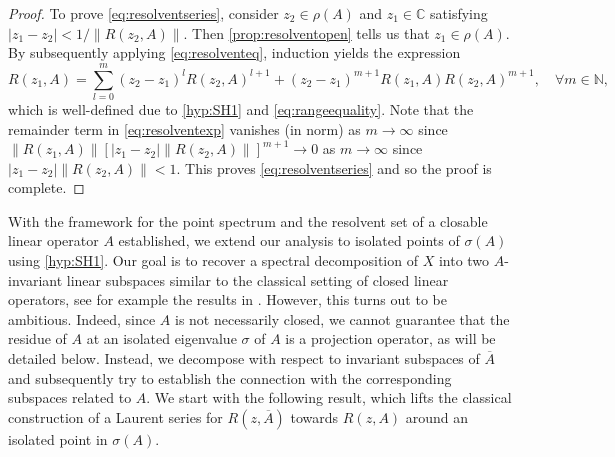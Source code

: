 \documentclass[english]{myarticle}
\begin{document}
\begin{sloppypar}
\begin{proof}
To prove \eqref{eq:resolventseries}, consider $z_2 \in \rho(A)$ and $z_1 \in \mathbb{C}$ satisfying $|z_1 - z_2| < 1/ \|R(z_2,A)\|$. Then \cref{prop:resolventopen} tells us that $z_1 \in \rho(A)$. By subsequently applying \eqref{eq:resolventeq}, induction yields the expression
\begin{equation} \label{eq:resolventexp}
    R(z_1,A) = \sum_{l=0}^{m} (z_2-z_1)^l R(z_2,A)^{l+1} + (z_2-z_1)^{m+1} R(z_1,A)R(z_2,A)^{m+1}, \quad \forall m \in \mathbb{N},
\end{equation}
which is well-defined due to \ref{hyp:SH1} and \eqref{eq:rangeequality}. Note that the remainder term in \eqref{eq:resolventexp} vanishes (in norm) as $m \to \infty$ since $\|R(z_1,A)\| [ |z_1-z_2| \|R(z_2,A)\|]^{m+1} \to 0$ as $m \to \infty$ since $|z_1 - z_2| \|R(z_2,A)\| < 1$. This proves \eqref{eq:resolventseries} and so the proof is complete.
\end{proof}

With the framework for the point spectrum and the resolvent set of a closable linear operator $A$ established, we extend our analysis to isolated points of $\sigma(A)$ using \ref{hyp:SH1}. Our goal is to recover a spectral decomposition of $X$ into two $A$-invariant linear subspaces similar to the classical setting of closed linear operators, see for example the results in \cite[Section XV.2]{Gohberg1990}. However, this turns out to be ambitious. Indeed, since $A$ is not necessarily closed, we cannot guarantee that the residue of $A$ at an isolated eigenvalue $\sigma$ of $A$ is a projection operator, as will be detailed below. Instead, we decompose with respect to invariant subspaces of $\overline{A}$ and subsequently try to establish the connection with the corresponding subspaces related to $A$. We start with the following result, which lifts the classical construction of a Laurent series for $R(z,\overline{A})$ towards $R(z,A)$ around an isolated point in $\sigma(A)$.


\end{sloppypar}
\end{document}
